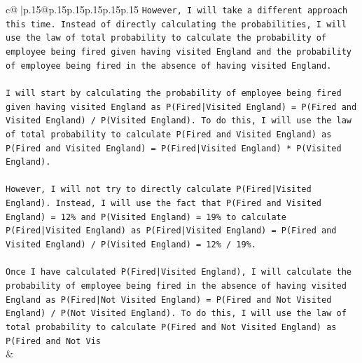 \documentclass{article}
\begin{document}
{\begin{supertabular}{c@{$\;$}|p{.15\linewidth}@{}p{.15\linewidth}p{.15\linewidth}p{.15\linewidth}p{.15\linewidth}p{.15\linewidth}}
{{{\texttt{However, I will take a different approach this time. Instead of directly calculating the probabilities, I will use the law of total probability to calculate the probability of employee being fired given having visited England and the probability of employee being fired in the absence of having visited England. } \\
\\ 
\texttt{I will start by calculating the probability of employee being fired given having visited England as P(Fired|Visited England) = P(Fired and Visited England) / P(Visited England). To do this, I will use the law of total probability to calculate P(Fired and Visited England) as P(Fired and Visited England) = P(Fired|Visited England) * P(Visited England). } \\
\\ 
\texttt{However, I will not try to directly calculate P(Fired|Visited England). Instead, I will use the fact that P(Fired and Visited England) = 12\% and P(Visited England) = 19\% to calculate P(Fired|Visited England) as P(Fired|Visited England) = P(Fired and Visited England) / P(Visited England) = 12\% / 19\%. } \\
\\ 
\texttt{Once I have calculated P(Fired|Visited England), I will calculate the probability of employee being fired in the absence of having visited England as P(Fired|Not Visited England) = P(Fired and Not Visited England) / P(Not Visited England). To do this, I will use the law of total probability to calculate P(Fired and Not Visited England) as P(Fired and Not Vis} \\
            }
        }
    }
    & \\ \\

\end{supertabular}
}
\end{document}
